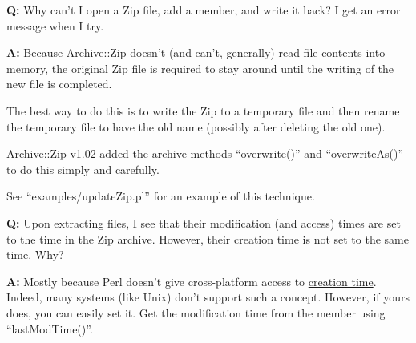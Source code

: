 \documentclass[]{article}
\let\realtextbf=\textbf
\renewcommand{\textbf}[1]{\textcolor{boldcolor}{\realtextbf{#1}}}
\renewcommand{\emph}[1]{\underline{#1}}
\begin{document}

\textbf{Q:} Why can't I open a Zip file, add a member, and write it
back? I get an error message when I try.

\textbf{A:} Because Archive::Zip doesn't (and can't, generally) read
file contents into memory, the original Zip file is required to stay
around until the writing of the new file is completed.

The best way to do this is to write the Zip to a temporary file and then
rename the temporary file to have the old name (possibly after deleting
the old one).

Archive::Zip v1.02 added the archive methods ``overwrite()'' and
``overwriteAs()'' to do this simply and carefully.

See ``examples/updateZip.pl'' for an example of this technique.


\textbf{Q:} Upon extracting files, I see that their modification (and
access) times are set to the time in the Zip archive. However, their
creation time is not set to the same time. Why?

\textbf{A:} Mostly because Perl doesn't give cross-platform access to
\emph{creation time}. Indeed, many systems (like Unix) don't support
such a concept. However, if yours does, you can easily set it. Get the
modification time from the member using ``lastModTime()''.

\end{document}
